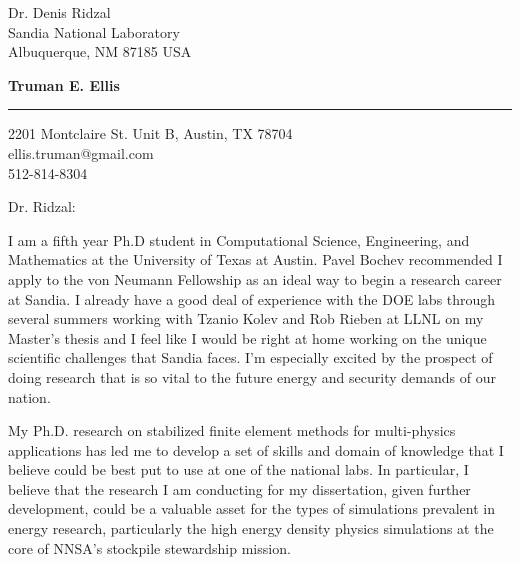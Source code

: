 \documentclass[letterpaper,12pt]{letter}
\begin{document}
\signature{Truman Everett Ellis}           %
\longindentation=0pt                       %
\let\raggedleft\raggedright                %
 
 
\begin{letter}{
Dr. Denis Ridzal\\
Sandia National Laboratory\\
Albuquerque, NM 87185 USA\\
}

\begin{flushleft}
{\large\bf Truman E. Ellis}
\end{flushleft}
\medskip\hrule height 1pt
\begin{flushright}
\hfill 2201 Montclaire St. Unit B, Austin, TX 78704 \\
\hfill ellis.truman@gmail.com\\
\hfill 512-814-8304\\
\end{flushright} 
\vfill %

 
\opening{Dr. Ridzal:} 
 
\noindent
I am a fifth year Ph.D student in Computational Science, Engineering, and Mathematics at the University of Texas at Austin.
Pavel Bochev recommended I apply to the von Neumann Fellowship as an ideal way to begin a research career at Sandia.
I already have a good deal of experience with the DOE labs through several summers working with 
Tzanio Kolev and Rob Rieben at LLNL on my Master's thesis 
and I feel like I would be right at home working on the unique scientific challenges that Sandia faces.
I'm especially excited by the prospect of doing research that is so vital to the future energy and security demands of our nation.

My Ph.D. research on stabilized finite element methods for multi-physics applications has led me to develop a 
set of skills and domain of knowledge that I believe could be best put to use at one of the national labs.
In particular, I believe that the research I am conducting for my dissertation, given further development,
could be a valuable asset for the types of simulations prevalent in energy research, particularly the high energy density physics simulations
at the core of NNSA's stockpile stewardship mission.


\end{letter}
\end{document}
